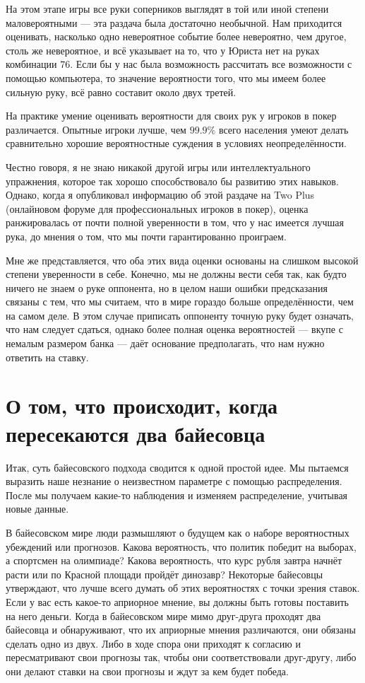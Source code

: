\documentclass[12pt, a4paper, oneside]{extreport}
\theoremstyle{plain}              %
\theoremstyle{definition}         %
\begin{document}
На этом этапе игры все руки соперников выглядят в той или иной степени маловероятными --- эта раздача была достаточно необычной. Нам приходится оценивать, насколько одно невероятное событие более невероятно, чем другое, столь же невероятное, и всё указывает на то, что у Юриста нет на руках комбинации $7$\clubsuit  $6$\clubsuit. Если бы у нас была возможность рассчитать все возможности с помощью компьютера, то значение вероятности того, что мы имеем более сильную руку, всё равно составит около двух третей.

На практике умение оценивать вероятности для своих рук у игроков в покер различается. Опытные игроки лучше, чем $99.9\%$ всего населения умеют делать сравнительно хорошие вероятностные суждения в условиях неопределённости.

Честно говоря, я не знаю никакой другой игры или интеллектуального упражнения, которое так хорошо способствовало бы развитию этих навыков. Однако, когда я опубликовал информацию об этой раздаче на Two Plus (онлайновом форуме для профессиональных игроков в покер), оценка ранжировалась от почти полной уверенности в том, что у нас имеется лучшая рука, до мнения о том, что мы почти гарантированно проиграем.

Мне же представляется, что оба этих вида оценки основаны на слишком высокой степени уверенности в себе. Конечно, мы не должны вести себя так, как будто ничего не знаем о руке оппонента, но в целом наши ошибки предсказания связаны с тем, что мы считаем, что в мире гораздо больше определённости, чем на самом деле. В этом случае приписать оппоненту точную руку будет означать, что нам следует сдаться, однако более полная оценка вероятностей --- вкупе с немалым размером банка --- даёт основание предполагать, что нам нужно ответить на ставку.


\section{О том, что происходит, когда пересекаются два байесовца}

Итак, суть байесовского подхода сводится к одной простой идее. Мы пытаемся выразить наше незнание о неизвестном параметре с помощью распределения. После мы получаем какие-то наблюдения и изменяем распределение, учитывая новые данные.

В байесовском мире люди размышляют о будущем как о наборе вероятностных убеждений или прогнозов. Какова вероятность, что политик победит на выборах, а спортсмен на олимпиаде? Какова вероятность, что курс рубля завтра начнёт расти или по Красной площади пройдёт динозавр? Некоторые байесовцы утверждают, что лучше всего думать об этих вероятностях с точки зрения ставок. Если у вас есть какое-то априорное мнение, вы должны быть готовы поставить на него деньги. Когда в байесовском мире мимо друг-друга проходят два байесовца и обнаруживают, что их априорные мнения различаются, они обязаны сделать одно из двух. Либо в ходе спора они приходят к согласию и пересматривают свои прогнозы так, чтобы они соответствовали друг-другу, либо они делают ставки на свои прогнозы и ждут за кем будет победа.
\end{document}
